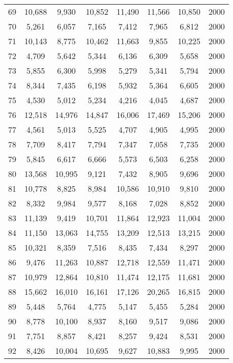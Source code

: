 \begin{longtable}{cccccccc}
69  & 10,688 & 9,930  & 10,852 & 11,490 & 11,566 & 10,850    & 2000 \\
70  & 5,261  & 6,057  & 7,165  & 7,412  & 7,965  & 6,812     & 2000 \\
71  & 10,143 & 8,775  & 10,462 & 11,663 & 9,855  & 10,225    & 2000 \\
72  & 4,709  & 5,642  & 5,344  & 6,136  & 6,309  & 5,658     & 2000 \\
73  & 5,855  & 6,300  & 5,998  & 5,279  & 5,341  & 5,794     & 2000 \\
74  & 8,344  & 7,435  & 6,198  & 5,932  & 5,364  & 6,605     & 2000 \\
75  & 4,530  & 5,012  & 5,234  & 4,216  & 4,045  & 4,687     & 2000 \\
76  & 12,518 & 14,976 & 14,847 & 16,006 & 17,469 & 15,206    & 2000 \\
77  & 4,561  & 5,013  & 5,525  & 4,707  & 4,905  & 4,995     & 2000 \\
78  & 7,709  & 8,417  & 7,794  & 7,347  & 7,058  & 7,735     & 2000 \\
79  & 5,845  & 6,617  & 6,666  & 5,573  & 6,503  & 6,258     & 2000 \\
80  & 13,568 & 10,995 & 9,121  & 7,432  & 8,905  & 9,696     & 2000 \\
81  & 10,778 & 8,825  & 8,984  & 10,586 & 10,910 & 9,810     & 2000 \\
82  & 8,332  & 9,984  & 9,577  & 8,168  & 7,028  & 8,852     & 2000 \\
83  & 11,139 & 9,419  & 10,701 & 11,864 & 12,923 & 11,004    & 2000 \\
84  & 11,150 & 13,063 & 14,755 & 13,209 & 12,513 & 13,215    & 2000 \\
85  & 10,321 & 8,359  & 7,516  & 8,435  & 7,434  & 8,297     & 2000 \\
86  & 9,476  & 11,263 & 10,887 & 12,718 & 12,559 & 11,471    & 2000 \\
87  & 10,979 & 12,864 & 10,810 & 11,474 & 12,175 & 11,681    & 2000 \\
88  & 15,662 & 16,010 & 16,161 & 17,126 & 20,265 & 16,815    & 2000 \\
89  & 5,448  & 5,764  & 4,775  & 5,147  & 5,455  & 5,284     & 2000 \\
90  & 8,778  & 10,100 & 8,937  & 8,160  & 9,517  & 9,086     & 2000 \\
91  & 7,751  & 8,857  & 8,421  & 8,257  & 9,424  & 8,531     & 2000 \\
92  & 8,426  & 10,004 & 10,695 & 9,627  & 10,883 & 9,995     & 2000 \\

\end{longtable}
